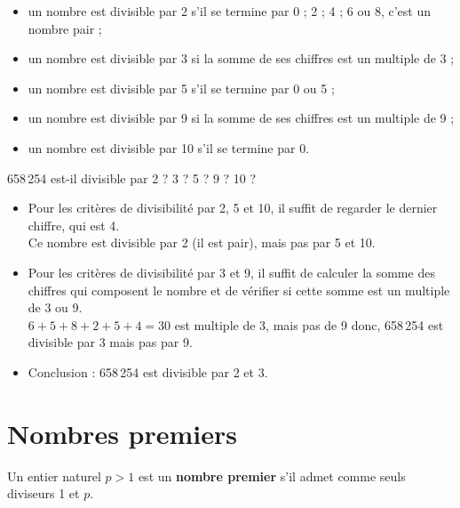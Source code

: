 \medskip


\begin{propriete}
   \begin{itemize}
      \item un nombre est divisible par 2 s'il se termine par 0 ; 2 ; 4 ; 6 ou 8, c'est un nombre pair ;
      \item un nombre est divisible par 3 si la somme de ses chiffres est un multiple de 3 ;
      \item un nombre est divisible par 5 s'il se termine par 0 ou 5 ;
      \item un nombre est divisible par 9 si la somme de ses chiffres est un multiple de 9 ;
      \item un nombre est divisible par 10 s'il se termine par 0. \\ [-8mm]
   \end{itemize}
\end{propriete}

\begin{exemple*1}
   658\,254 est-il divisible par 2 ? 3 ? 5 ? 9 ? 10 ?
   \begin{itemize}
      \item Pour les critères de divisibilité par 2, 5 et 10, il suffit de regarder le dernier chiffre, qui est 4. \\
         Ce nombre est divisible par 2 (il est pair), mais pas par 5 et 10.
      \item Pour les critères de divisibilité par 3 et 9, il suffit de calculer la somme des chiffres qui composent le nombre et de vérifier si cette somme est un multiple de 3 ou 9. \\
         $6+5+8+2+5+4 =30$ est multiple de 3, mais pas de 9 donc, 658\,254 est divisible par 3 mais pas par 9.
      \item Conclusion : 658\,254 est divisible par 2 et 3. \\ [-10mm]
   \end{itemize}
\end{exemple*1}


\section{Nombres premiers}

\begin{definition}
   Un entier naturel $p>1$ est un \textbf{nombre premier} s'il admet comme seuls diviseurs 1 et $p$.
\end{definition}

